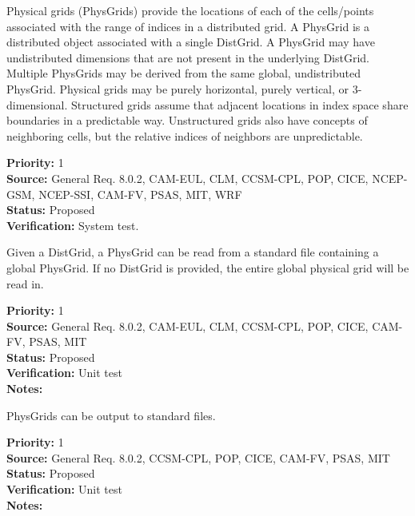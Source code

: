 
Physical grids (PhysGrids) provide the locations of each of the cells/points
associated with the range of indices in a distributed grid.  A PhysGrid is a
distributed object associated with a single DistGrid.  A PhysGrid may have
undistributed dimensions that are not present in the underlying DistGrid. 
Multiple PhysGrids may be derived from the same global, undistributed PhysGrid. 
Physical grids may be purely horizontal, purely vertical, or 3-dimensional. 
Structured grids assume that adjacent locations in index space share boundaries
in a predictable way.  Unstructured grids also have concepts of neighboring
cells, but the relative indices of neighbors are unpredictable.

\begin{reqlist}
{\bf Priority:} 1 \\
{\bf Source:} General Req. 8.0.2, CAM-EUL, CLM, CCSM-CPL, POP, CICE, NCEP-GSM, NCEP-SSI,
     CAM-FV, PSAS, MIT, WRF \\
{\bf Status:} Proposed \\
{\bf Verification:} System test.
\end{reqlist}

Given a DistGrid, a PhysGrid can be read from a standard file containing a
global PhysGrid. If no DistGrid is provided, the entire global physical grid will
be read in.
\begin{reqlist}
{\bf Priority:} 1 \\
{\bf Source:} General Req. 8.0.2, CAM-EUL, CLM, CCSM-CPL, POP, CICE, 
              CAM-FV, PSAS, MIT \\
{\bf Status:} Proposed \\
{\bf Verification:} Unit test\\
{\bf Notes:} 
\end{reqlist}

PhysGrids can be output to standard files.
\begin{reqlist}
{\bf Priority:} 1 \\
{\bf Source:} General Req. 8.0.2, CCSM-CPL, POP, CICE, 
              CAM-FV, PSAS, MIT \\
{\bf Status:} Proposed \\
{\bf Verification:} Unit test\\
{\bf Notes:} 
\end{reqlist}

